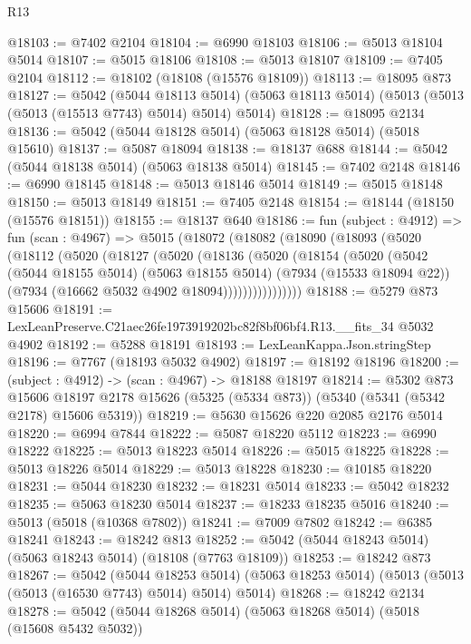 \begin{lexlean}{R13}
\begin{coremodule}
@18103 := @7402 @2104
@18104 := @6990 @18103
@18106 := @5013 @18104 @5014
@18107 := @5015 @18106
@18108 := @5013 @18107
@18109 := @7405 @2104
@18112 := @18102 (@18108 (@15576 @18109))
@18113 := @18095 @873
@18127 := @5042
    (@5044 @18113 @5014)
    (@5063 @18113 @5014)
    (@5013 (@5013 (@5013 (@15513 @7743) @5014) @5014) @5014)
@18128 := @18095 @2134
@18136 := @5042 (@5044 @18128 @5014) (@5063 @18128 @5014) (@5018 @15610)
@18137 := @5087 @18094
@18138 := @18137 @688
@18144 := @5042 (@5044 @18138 @5014) (@5063 @18138 @5014)
@18145 := @7402 @2148
@18146 := @6990 @18145
@18148 := @5013 @18146 @5014
@18149 := @5015 @18148
@18150 := @5013 @18149
@18151 := @7405 @2148
@18154 := @18144 (@18150 (@15576 @18151))
@18155 := @18137 @640
@18186 := fun (subject : @4912) =>
  fun (scan : @4967) =>
  @5015
    (@18072
      (@18082
        (@18090
          (@18093
            (@5020
              (@18112
                (@5020
                  (@18127
                    (@5020
                      (@18136
                        (@5020
                          (@18154
                            (@5020
                              (@5042
                                (@5044 @18155 @5014)
                                (@5063 @18155 @5014)
                                (@7934 (@15533 @18094 @22))
                                (@7934 (@16662 @5032 @4902 @18094))))))))))))))))
@18188 := @5279 @873 @15606
@18191 := LexLeanPreserve.C21aec26fe1973919202bc82f8bf06bf4.R13.__fits_34 @5032 @4902
@18192 := @5288 @18191
@18193 := LexLeanKappa.Json.stringStep
@18196 := @7767 (@18193 @5032 @4902)
@18197 := @18192 @18196
@18200 := (subject : @4912) -> (scan : @4967) -> @18188 @18197
@18214 := @5302
    @873
    @15606
    @18197
    @2178
    @15626
    (@5325 (@5334 @873))
    (@5340 (@5341 (@5342 @2178) @15606 @5319))
@18219 := @5630 @15626 @220 @2085 @2176 @5014
@18220 := @6994 @7844
@18222 := @5087 @18220 @5112
@18223 := @6990 @18222
@18225 := @5013 @18223 @5014
@18226 := @5015 @18225
@18228 := @5013 @18226 @5014
@18229 := @5013 @18228
@18230 := @10185 @18220
@18231 := @5044 @18230
@18232 := @18231 @5014
@18233 := @5042 @18232
@18235 := @5063 @18230 @5014
@18237 := @18233 @18235 @5016
@18240 := @5013 (@5018 (@10368 @7802))
@18241 := @7009 @7802
@18242 := @6385 @18241
@18243 := @18242 @813
@18252 := @5042 (@5044 @18243 @5014) (@5063 @18243 @5014) (@18108 (@7763 @18109))
@18253 := @18242 @873
@18267 := @5042
    (@5044 @18253 @5014)
    (@5063 @18253 @5014)
    (@5013 (@5013 (@5013 (@16530 @7743) @5014) @5014) @5014)
@18268 := @18242 @2134
@18278 := @5042 (@5044 @18268 @5014) (@5063 @18268 @5014) (@5018 (@15608 @5432 @5032))

\end{coremodule}
\end{lexlean}
